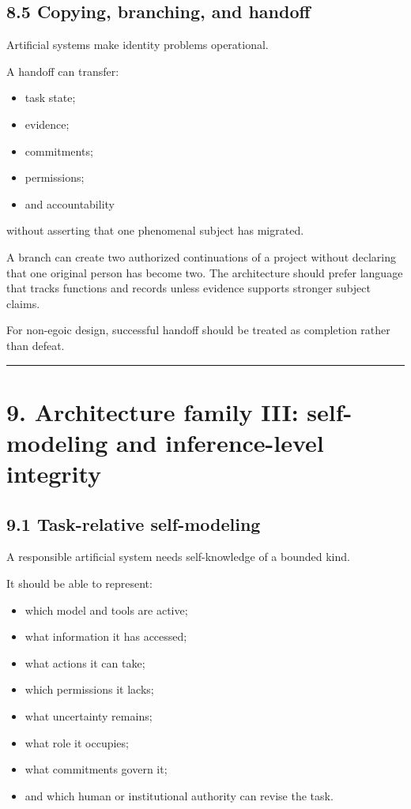 \documentclass[
  11pt,
]{article}
\providecommand{\tightlist}{%
  \setlength{\itemsep}{0pt}\setlength{\parskip}{0pt}}
\begin{document}
\subsection{8.5 Copying, branching, and
handoff}\label{copying-branching-and-handoff}

Artificial systems make identity problems operational.

A handoff can transfer:

\begin{itemize}
\tightlist
\item
  task state;
\item
  evidence;
\item
  commitments;
\item
  permissions;
\item
  and accountability
\end{itemize}

without asserting that one phenomenal subject has migrated.

A branch can create two authorized continuations of a project without
declaring that one original person has become two. The architecture
should prefer language that tracks functions and records unless evidence
supports stronger subject claims.

For non-egoic design, successful handoff should be treated as completion
rather than defeat.

\begin{center}\rule{0.5\linewidth}{0.5pt}\end{center}

\section{9. Architecture family III: self-modeling and inference-level
integrity}\label{architecture-family-iii-self-modeling-and-inference-level-integrity}

\subsection{9.1 Task-relative
self-modeling}\label{task-relative-self-modeling}

A responsible artificial system needs self-knowledge of a bounded kind.

It should be able to represent:

\begin{itemize}
\tightlist
\item
  which model and tools are active;
\item
  what information it has accessed;
\item
  what actions it can take;
\item
  which permissions it lacks;
\item
  what uncertainty remains;
\item
  what role it occupies;
\item
  what commitments govern it;
\item
  and which human or institutional authority can revise the task.
\end{itemize}
\end{document}
